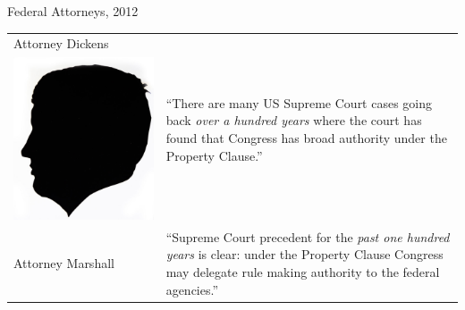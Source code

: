 \begin{frame}{Federal Attorneys, 2012}
\begin{table}[h]
\centering
\begin{tabular}{p{} p{}} 
    { \tiny Attorney Dickens } &
        \multirow{2}{.7\textwidth}{ ``There are many US Supreme Court cases going
        back \emph{over a hundred years} where the court has found that Congress has
        broad authority under the Property Clause.''} \\
        { \includegraphics[height=0.15\textheight]{img/elmer-dickens.png} } & \\
    { \tiny Attorney Marshall } & 
        \multirow{2}{.7\textwidth}{``Supreme Court precedent for the \emph{past one hundred years} is clear: under the Property Clause Congress may delegate rule making authority to the federal agencies.'' } \\

\end{tabular}
\end{table}
\end{frame}
